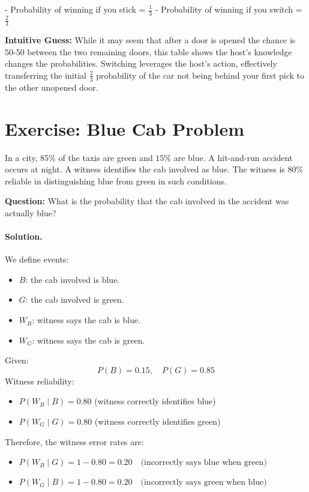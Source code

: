 \documentclass[11pt]{article}
\newif\ifshowanswers
\begin{document}
- Probability of winning if you stick = $\frac{1}{3}$
- Probability of winning if you switch = $\frac{2}{3}$

\noindent
\textbf{Intuitive Guess:} While it may seem that after a door is opened the chance is 50-50 between the two remaining doors, this table shows the host’s knowledge changes the probabilities. Switching leverages the host’s action, effectively transferring the initial $\frac{2}{3}$ probability of the car not being behind your first pick to the other unopened door.
\fi


\section{Exercise: Blue Cab Problem}
In a city, 85\% of the taxis are green and $15\%$ are blue. A hit-and-run accident occurs at night. A witness identifies the cab involved as blue. The witness is 80\% reliable in distinguishing blue from green in such conditions.

\noindent
\textbf{Question:}
What is the probability that the cab involved in the accident was actually blue?

\vspace{1cm}

\ifshowanswers
\paragraph{Solution.}

We define events:

\begin{itemize}
  \item $B$: the cab involved is blue.
  \item $G$: the cab involved is green.
  \item $W_B$: witness says the cab is blue.
  \item $W_G$: witness says the cab is green.
\end{itemize}

Given:
\[
P(B) = 0.15, \quad P(G) = 0.85
\]
Witness reliability:
\begin{itemize}
  \item $P(W_B \mid B) = 0.80$ (witness correctly identifies blue)
  \item $P(W_G \mid G) = 0.80$ (witness correctly identifies green)
\end{itemize}

\noindent
Therefore, the witness error rates are:
\begin{itemize}
  \item $P(W_B \mid G) = 1 - 0.80 = 0.20 \quad \text{(incorrectly says blue when green)}$
  \item $P(W_G \mid B) = 1 - 0.80 = 0.20 \quad \text{(incorrectly says green when blue)}$
\end{itemize}
\end{document}
